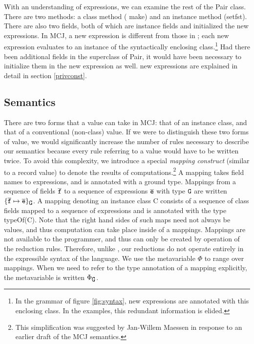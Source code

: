 \documentclass{acmconfbig}
\begin{document}
With an understanding of expressions, we can examine the rest of the
{\txt Pair} class.  There are two methods: a class method ({\txt
make}) and an instance method ({\txt setfst}).  There are also two
fields, both of which are instance fields and initialized the {\txt
new} expressions. In MCJ, a {\txt new} expression is different from
those in \FGJ; each {\txt new} expression evaluates to an instance of
the syntactically enclosing class.\footnote{In the grammar of figure
\ref{fig:syntax}, {\txt new} expressions are annotated with this
enclosing class.  In the examples, this redundant information is
elided.}  Had there been additional fields in the superclass of {\txt
Pair}, it would have been necessary to initialize them in the {\txt
new} expression as well. {\txt new} expressions are explained in
detail in section \ref{privconst}.


\subsection{Semantics}
\label{formalsem}

There are two forms that a value can take in MCJ: that of an instance
class, and that of a conventional (non-class) value. If we were to
distinguish these two forms of value, we would significantly increase
the number of rules necessary to describe our semantics because every
rule referring to a value would have to be written twice. To avoid
this complexity, we introduce a special {\em mapping construct}
(similar to a record value) to denote the results of
computations.\footnote{This simplification was suggested by Jan-Willem
Maessen in response to an earlier draft of the MCJ semantics.}  A
mapping takes field names to expressions, and is annotated with a
ground type. Mappings from a sequence of fields ${\overline{{\mbox {\tt f}}}}$ to a sequence of
expressions ${\overline{{\mbox {\tt e}}}}$ with type $\mbox {\tt G}$ are written $\{{{\overline{{\mbox {\tt f}}}}} \mapsto {\ensuremath {{\overline{{\mbox {\tt e}}}}}}\}_{\mbox {\tt G}}$.
A mapping denoting an instance class {\txt C} consists of a sequence
of class fields mapped to a sequence of expressions and is annotated
with the type {\txt typeOf(C)}. Note that the right hand sides of such
maps need not always be values, and thus computation can take place
inside of a mappings.  Mappings are not available to the programmer,
and thus can only be created by operation of the reduction rules.
Therefore, unlike \FJ, our reductions do not operate entirely in the
expressible syntax of the language.  We use the metavariable $\Phi$ to
range over mappings.  When we need to refer to the type annotation of
a mapping explicitly, the metavariable is written $\Phi_{\mbox {\tt G}}$.
\end{document}

